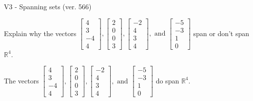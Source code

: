 \begin{exercise}
  \begin{exerciseTitle}V3 - Spanning sets (ver. 566)\end{exerciseTitle}
  \begin{exerciseStatement}
    Explain why the vectors \(\left[\begin{array}{r}
4 \\
3 \\
-4 \\
4
\end{array}\right] , \left[\begin{array}{r}
2 \\
0 \\
0 \\
3
\end{array}\right] , \left[\begin{array}{r}
-2 \\
4 \\
3 \\
4
\end{array}\right] , \text{ and } \left[\begin{array}{r}
-5 \\
-3 \\
1 \\
0
\end{array}\right]\) span or don't span \(\mathbb{R}^4\). 
	


  \end{exerciseStatement}
  \begin{exerciseAnswer}
   The vectors \(\left[\begin{array}{r}
4 \\
3 \\
-4 \\
4
\end{array}\right] , \left[\begin{array}{r}
2 \\
0 \\
0 \\
3
\end{array}\right] , \left[\begin{array}{r}
-2 \\
4 \\
3 \\
4
\end{array}\right] , \text{ and } \left[\begin{array}{r}
-5 \\
-3 \\
1 \\
0
\end{array}\right]\) 
  	 do  
	span \(\mathbb{R}^4\).
  


  \end{exerciseAnswer}
\end{exercise}